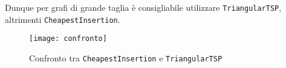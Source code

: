 Dunque per grafi di grande taglia è consigliabile utilizzare \texttt{TriangularTSP}, altrimenti \texttt{CheapestInsertion}.

\begin{figure}
	\centering
	\texttt{[image: confronto]}
	\caption{Confronto tra \texttt{CheapestInsertion} e \texttt{TriangularTSP}}
	\label{confronto}
\end{figure}
